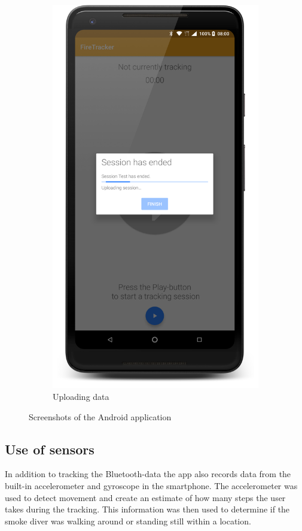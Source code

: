 \documentclass[../Main/thesis.tex]{subfiles}
\begin{document}
\begin{figure}[h]
\begin{subfigure}{0.2\textwidth}
		\includegraphics[width=\textwidth]{../fig/firetracker_app_old_4}
		\caption{Uploading data}
		\label{fig:app-first-prototype-upload}
	\end{subfigure}
	\caption{Screenshots of the Android application}
	\label{fig:app-first-prototype}
\end{figure}

\subsection*{Use of sensors}
In addition to tracking the Bluetooth-data the app also records data from the built-in accelerometer and gyroscope in the smartphone.
The accelerometer was used to detect movement and create an estimate of how many steps the user takes during the tracking.
This information was then used to determine if the smoke diver was walking around or standing still within a location.
\end{document}
